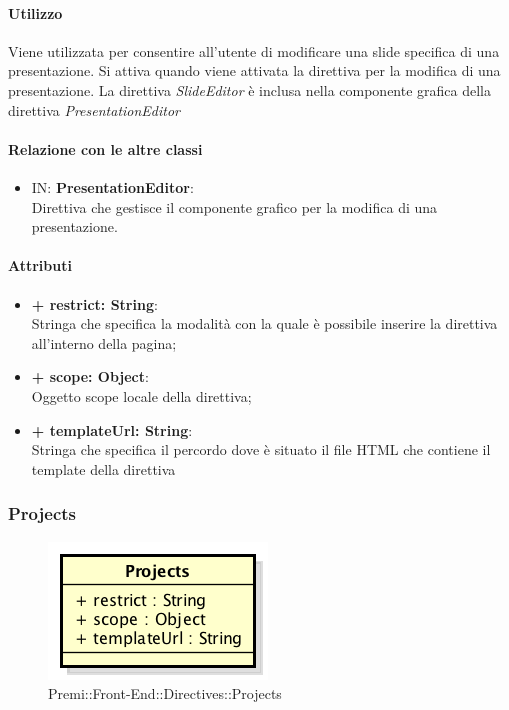 	\paragraph{Utilizzo}
	Viene utilizzata per consentire all'utente di modificare una \gls{slide} specifica di una presentazione. Si attiva quando viene attivata la direttiva per la modifica di una presentazione. La direttiva \textit{SlideEditor} è inclusa nella componente grafica della direttiva \textit{PresentationEditor}
	
	\paragraph{Relazione con le altre classi}
	\begin{itemize}
		\item IN: \textbf{PresentationEditor}:\\
		Direttiva che gestisce il componente grafico per la modifica di una presentazione.
	\end{itemize}
	
	\paragraph{Attributi}
	\begin{itemize}
		\item \textbf{+ restrict: String}:\\
		Stringa che specifica la modalità con la quale è possibile inserire la direttiva all'interno della pagina;
		\item \textbf{+ scope: Object}:\\
		Oggetto scope locale della direttiva;
		\item \textbf{+ templateUrl: String}:\\
		Stringa che specifica il percordo dove è situato il file \gls{HTML} che contiene il \gls{template} della direttiva
	\end{itemize}
\newpage


\subsubsection{Projects}
	\begin{figure}[h]
		\centering
		\includegraphics[width=0.5\linewidth]{img/premi_front_end_directives_projects}
		\caption[Premi::Front-End::Directives::Projects]{Premi::Front-End::Directives::Projects}
	\end{figure}
	

